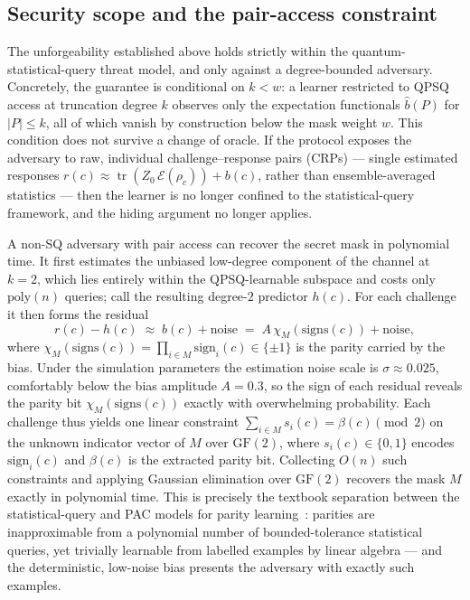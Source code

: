 \documentclass[11pt]{article}
\newcommand{\E}{\mathcal{E}}
\newcommand{\tr}{\operatorname{tr}}
\begin{document}
\subsection{Security scope and the pair-access constraint}
\label{sec:pair-access}

The unforgeability established above holds strictly within the
quantum-statistical-query threat model, and only against a degree-bounded
adversary. Concretely, the guarantee is conditional on $k < w$: a learner
restricted to QPSQ access at truncation degree $k$ observes only the
expectation functionals $\hat b(P)$ for $|P| \le k$, all of which vanish by
construction below the mask weight $w$. This condition does not survive a
change of oracle. If the protocol exposes the adversary to raw, individual
challenge--response pairs (CRPs) --- single estimated responses
$r(c) \approx \tr(Z_0\,\E(\rho_c)) + b(c)$, rather than ensemble-averaged
statistics --- then the learner is no longer confined to the statistical-query
framework, and the hiding argument no longer applies.

A non-SQ adversary with pair access can recover the secret mask in polynomial
time. It first estimates the unbiased low-degree component of the channel at
$k = 2$, which lies entirely within the QPSQ-learnable subspace and costs only
$\mathrm{poly}(n)$ queries; call the resulting degree-$2$ predictor $h(c)$. For
each challenge it then forms the residual
\[
  r(c) - h(c) \;\approx\; b(c) + \text{noise}
            \;=\; A\,\chi_M(\mathrm{signs}(c)) + \text{noise},
\]
where $\chi_M(\mathrm{signs}(c)) = \prod_{i\in M}\mathrm{sign}_i(c) \in \{\pm 1\}$
is the parity carried by the bias. Under the simulation parameters the
estimation noise scale is $\sigma \approx 0.025$, comfortably below the bias
amplitude $A = 0.3$, so the sign of each residual reveals the parity bit
$\chi_M(\mathrm{signs}(c))$ exactly with overwhelming probability. Each
challenge thus yields one linear constraint $\sum_{i\in M}s_i(c) = \beta(c)
\pmod 2$ on the unknown indicator vector of $M$ over $\mathrm{GF}(2)$, where
$s_i(c)\in\{0,1\}$ encodes $\mathrm{sign}_i(c)$ and $\beta(c)$ is the extracted
parity bit. Collecting $O(n)$ such constraints and applying Gaussian
elimination over $\mathrm{GF}(2)$ recovers the mask $M$ exactly in polynomial
time. This is precisely the textbook separation between the statistical-query
and PAC models for parity learning~\cite{kearns1993,valiant1984pac}: parities
are inapproximable from a polynomial number of bounded-tolerance statistical
queries, yet trivially learnable from labelled examples by linear algebra ---
and the deterministic, low-noise bias presents the adversary with exactly such
examples.
\end{document}
